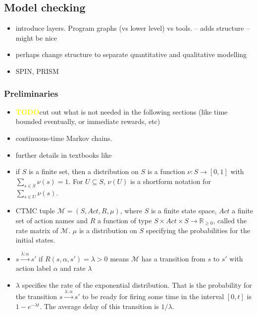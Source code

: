 \documentclass[a4paper, 10pt]{article}
\def \todo{\textbf{\textcolor{yellow}{TODO}}}
\begin{document}
\begin{enumerate}
\subsection{Model checking}
\label{ssec:analysis-modelchecking}
\begin{itemize}
	\item introduce layers. Program graphs (vs lower level) vs tools. -- adds structure -- might be nice
	\item perhaps change structure to separate quantitative and qualitative modelling
	\item SPIN\cite{spin, hol97}, PRISM\cite{prism, knp09}
\end{itemize}

\subsubsection{Preliminaries}
\label{sssec:analysis-modelchecking-preliminaries}
\begin{itemize}
	\item \todo cut out what is not needed in the following sections (like time bounded eventually, or immediate rewards, etc)
	\item continuous-time Markov chains.
	\item further details in textbooks like \cite{kul95, ks76}
	\item if $S$ is a finite set, then a distribution on $S$ is a function $\nu:S \rightarrow [0,1]$ with $\sum\limits_{s \in S} \nu (s) = 1$. For $U \subseteq S$, $\nu (U)$ is a shortform notation for $\sum\limits_{s \in U} \nu (s)$.
	\item CTMC tuple $\mathcal{M} = (S, \mathit{Act}, R, \mu)$, where $S$ is a finite state space, $Act$ a finite set of action names and $R$ a function of type $S \times \mathit{Act} \times S \rightarrow \mathbb{R}_{\ge 0}$, called the rate matrix of $\mathcal{M}$. $\mu$ is a distribution on $S$ specifying the probabilities for the initial states.
	\item $s \xrightarrow{\lambda : \alpha} s'$ if $R(s, \alpha, s') = \lambda > 0$ means $\mathcal{M}$ has a transition from $s$ to $s'$ with action label $\alpha$ and rate $\lambda$
	\item $\lambda$ specifies the rate of the exponential distribution. That is the probability for the transition $s \xrightarrow{\lambda : \alpha} s'$ to be ready for firing some time in the interval $[0,t]$ is $1-e^{- \lambda t}$. The average delay  of this transition is $1 / \lambda$.

\end{itemize}
\end{enumerate}
\end{document}
